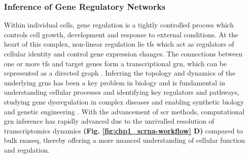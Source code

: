 \subsubsection{Inference of Gene Regulatory Networks}
\label{subsubsec:chp1_int_grn}
\par Within individual cells, gene regulation is a tightly controlled process which controls cell growth, development and response to external conditions. At the heart of this complex, non-linear regulation lie \glspl{tf} which act as regulators of cellular identity and control gene expression changes. The connections between one or more \glspl{tf} and target genes form a transcriptional \gls{grn}, which can be represented as a directed graph \textbf{\cite{skok_gibbs_high-performance_2022}}. Inferring the topology and dynamics of the underlying \glspl{grn} has been a key problem in biology and is fundamental in understanding cellular processes and identifying key regulators and pathways, studying gene dysregulation in complex diseases and enabling synthetic biology and genetic engineering \textbf{\cite{lueckenmalte_d_current_2019,skok_gibbs_high-performance_2022,huang_scgrn_2024}}. With the advancement of \gls{scr} methods, computational \gls{grn} inference has rapidly advanced due to the unrivalled resolution of transcriptomics dynamics \textbf{(Fig. \ref{fig:chp1_scrna-workflow} D)} \textbf{\cite{kim_review_2024}} compared to bulk \gls{rnaseq}, thereby offering a more nuanced understanding of cellular function and regulation.\\




